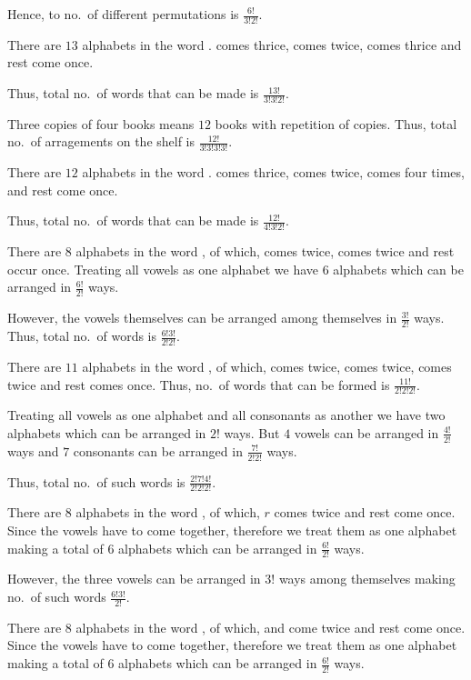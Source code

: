   Hence, to no.\ of different permutations is $\frac{6!}{3!2!}$.
\item There are $13$ alphabets in the word .  comes thrice, 
  comes twice,  comes thrice and rest come once.

  Thus, total no.\ of words that can be made is $\frac{13!}{3!3!2!}$.
\item Three copies of four books means $12$ books with repetition of copies. Thus, total no.\ of arragements
  on the shelf is $\frac{12!}{3!3!3!3!}$.
\item There are $12$ alphabets in the word .  comes thrice,  comes
  twice,  comes four times, and rest come once.

  Thus, total no.\ of words that can be made is $\frac{12!}{4!3!2!}$.
\item There are $8$ alphabets in the word , of which,  comes twice, 
  comes twice and rest occur once. Treating all vowels as one alphabet we have $6$ alphabets which can be
  arranged in $\frac{6!}{2!}$ ways.

  However, the vowels themselves can be arranged among themselves in $\frac{3!}{2!}$ ways. Thus, total
  no.\ of words is $\frac{6!3!}{2!2!}$.
\item There are $11$ alphabets in the word , of  which,  comes twice,
   comes twice,  comes twice and rest comes once. Thus, no.\ of words that can be formed is
  $\frac{11!}{2!2!2!}$.

  Treating all vowels as one alphabet and all consonants as another we have two alphabets which can be
  arranged in $2!$ ways. But $4$ vowels can be arranged in $\frac{4!}{2!}$ ways and $7$ consonants can be
  arranged in $\frac{7!}{2!2!}$ ways.

  Thus, total no.\ of such words is $\frac{2!7!4!}{2!2!2!}$.
\item There are $8$ alphabets in the word , of which, $r$ comes twice and rest come
  once. Since the vowels have to come together, therefore we treat them as one alphabet making a total of
  $6$ alphabets which can be arranged in $\frac{6!}{2!}$ ways.

  However, the three vowels can be arranged in $3!$ ways among themselves making no.\ of such words
  $\frac{6!3!}{2!}$.
\item There are $8$ alphabets in the word , of which,  and  come
  twice and rest come once. Since the vowels have to come together, therefore we treat them as one alphabet
  making a total of $6$ alphabets which can be arranged in $\frac{6!}{2!}$ ways.

